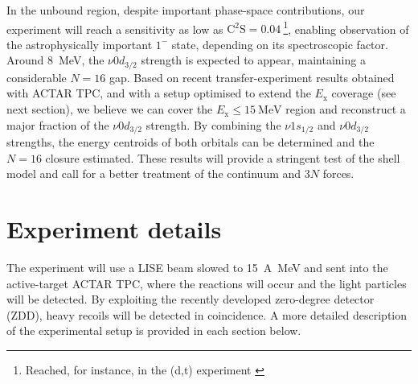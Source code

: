 \documentclass[a4paper, 10pt]{article}
\newcommand{\iso}[2]{\ce{^{#1}#2}}
\newcommand{\ex}{\ensuremath{E_{\text{x}}}\xspace}
\newcommand{\ctwos}{\ensuremath{\text{C}^2\text{S}}\xspace}
\begin{document}
In the unbound region, despite important phase-space contributions, our experiment will reach a sensitivity as low as $\ctwos = \qty{0.04}{}$\footnote{Reached, for instance, in the \iso{20}{O}(d,t) experiment \cite{lozano-gonzalez2026a}}, enabling observation of the astrophysically important $1^-$ state, depending on its spectroscopic factor. Around \qty{8}{\MeV}, the $\nu0d_{3/2}$ strength is expected to appear, maintaining a considerable $N=16$ gap. Based on recent transfer-experiment results \cite{loisfuentes2026,lozano-gonzalez2026a} obtained with ACTAR TPC, and with a setup optimised to extend the \ex coverage (see next section), we believe we can cover the $\ex \leq \qty{15}{\MeV}$ region and reconstruct a major fraction of the $\nu0d_{3/2}$ strength. By combining the $\nu1s_{1/2}$ and $\nu0d_{3/2}$ strengths, the energy centroids of both orbitals can be determined and the $N=16$ closure estimated. These results will provide a stringent test of the shell model and call for a better treatment of the continuum and $3N$ forces.


\section*{Experiment details}
The experiment will use a LISE \iso{17}{C} beam slowed to \qty{15}{A\MeV} and sent into the active-target ACTAR TPC, where the reactions will occur and the light particles will be detected. By exploiting the recently developed zero-degree detector (ZDD), heavy recoils will be detected in coincidence. A more detailed description of the experimental setup is provided in each section below.
\end{document}

